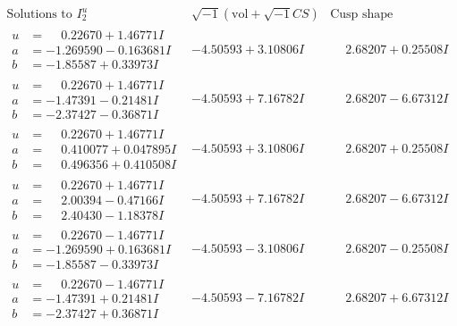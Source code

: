 \documentclass[1p]{elsarticle_modified}
\theoremstyle{definition}
\newcommand{\I}{\sqrt{-1}}
\begin{document}
$$\begin{array}{c|c|c}  
\text{Solutions to }I^u_{2}& \I (\text{vol} + \sqrt{-1}CS) & \text{Cusp shape}\\
 \hline 
\begin{aligned}
u &= \phantom{-}0.22670 + 1.46771 I \\
a &= -1.269590 - 0.163681 I \\
b &= -1.85587 + 0.33973 I\end{aligned}
 & -4.50593 + 3.10806 I & \phantom{-}2.68207 + 0.25508 I \\ \hline\begin{aligned}
u &= \phantom{-}0.22670 + 1.46771 I \\
a &= -1.47391 - 0.21481 I \\
b &= -2.37427 - 0.36871 I\end{aligned}
 & -4.50593 + 7.16782 I & \phantom{-}2.68207 - 6.67312 I \\ \hline\begin{aligned}
u &= \phantom{-}0.22670 + 1.46771 I \\
a &= \phantom{-}0.410077 + 0.047895 I \\
b &= \phantom{-}0.496356 + 0.410508 I\end{aligned}
 & -4.50593 + 3.10806 I & \phantom{-}2.68207 + 0.25508 I \\ \hline\begin{aligned}
u &= \phantom{-}0.22670 + 1.46771 I \\
a &= \phantom{-}2.00394 - 0.47166 I \\
b &= \phantom{-}2.40430 - 1.18378 I\end{aligned}
 & -4.50593 + 7.16782 I & \phantom{-}2.68207 - 6.67312 I \\ \hline\begin{aligned}
u &= \phantom{-}0.22670 - 1.46771 I \\
a &= -1.269590 + 0.163681 I \\
b &= -1.85587 - 0.33973 I\end{aligned}
 & -4.50593 - 3.10806 I & \phantom{-}2.68207 - 0.25508 I \\ \hline\begin{aligned}
u &= \phantom{-}0.22670 - 1.46771 I \\
a &= -1.47391 + 0.21481 I \\
b &= -2.37427 + 0.36871 I\end{aligned}
 & -4.50593 - 7.16782 I & \phantom{-}2.68207 + 6.67312 I \\ \hline\begin{aligned}

\end{aligned}
\end{array}$$
\end{document}
